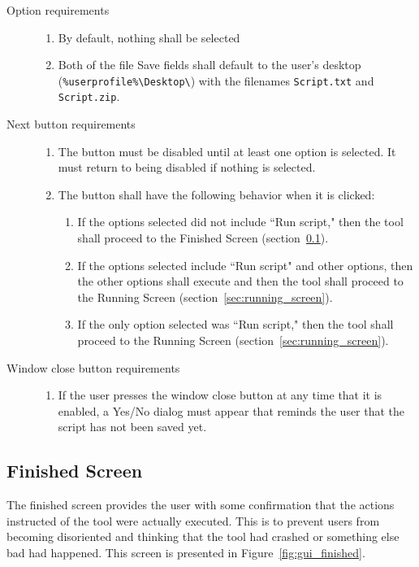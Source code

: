 \begin{description}
\item[Option requirements] \hfill
\begin{enumerate}
  \item By default, nothing shall be selected
  \item Both of the file Save fields shall default to the user's desktop
  (\verb|%userprofile%\Desktop\|) with the filenames \verb|Script.txt| and
  \verb|Script.zip|.
\end{enumerate}
\item[Next button requirements] \hfill
\begin{enumerate}
  \item The button must be disabled until at least one option is selected. It
  must return to being disabled if nothing is selected.
  \item The button shall have the following behavior when it is clicked:
  \begin{enumerate}
    \item If the options selected did not include ``Run script," then the tool
    shall proceed to the Finished Screen (section~\ref{sec:finished_screen}).
    \item If the options selected include ``Run script" and other options, then
    the other options shall execute and then the tool shall proceed to the
    Running Screen (section~\ref{sec:running_screen}).
    \item If the only option selected was ``Run script," then the tool shall
    proceed to the Running Screen (section~\ref{sec:running_screen}).
  \end{enumerate}
\end{enumerate}
\item[Window close button requirements] \hfill
\begin{enumerate}
  \item If the user presses the window close button at any time that it is
  enabled, a Yes/No dialog must appear that reminds the user that the script
  has not been saved yet.
\end{enumerate}
\end{description}

\subsection{Finished Screen} \label{sec:finished_screen}
The finished screen provides the user with some confirmation that the actions
instructed of the tool were actually executed.  This is to prevent users from
becoming disoriented and thinking that the tool had crashed or something else
bad had happened.  This screen is presented in Figure~\ref{fig:gui_finished}.

